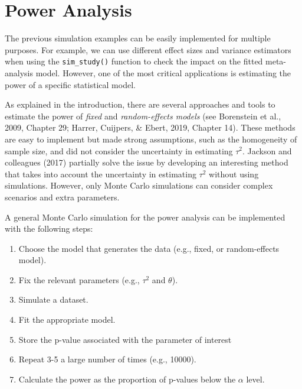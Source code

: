 \documentclass[
  man,floatsintext]{apa6}
\providecommand{\tightlist}{%
  \setlength{\itemsep}{0pt}\setlength{\parskip}{0pt}}
\begin{document}
\normalsize

\hypertarget{power-analysis}{%
\section{Power Analysis}\label{power-analysis}}

The previous simulation examples can be easily implemented for multiple purposes. For example, we can use different effect sizes and variance estimators when using the \texttt{sim\_study()} function to check the impact on the fitted meta-analysis model. However, one of the most critical applications is estimating the power of a specific statistical model.

As explained in the introduction, there are several approaches and tools to estimate the power of \emph{fixed} and \emph{random-effects models} (see Borenstein et al., 2009, Chapter 29; Harrer, Cuijpers, \& Ebert, 2019, Chapter 14). These methods are easy to implement but made strong assumptions, such as the homogeneity of sample size, and did not consider the uncertainty in estimating \(\tau^{2}\). Jackson and colleagues (2017)
partially solve the issue by developing an interesting method that takes into account the uncertainty in estimating \(\tau^{2}\) without using simulations. However, only Monte Carlo simulations can consider complex scenarios and extra parameters.

A general Monte Carlo simulation for the power analysis can be implemented with the following steps:

\begin{enumerate}
\def\labelenumi{\arabic{enumi}.}
\tightlist
\item
  Choose the model that generates the data (e.g., fixed, or random-effects model).
\item
  Fix the relevant parameters (e.g., \(\tau^{2}\) and \(\theta\)).
\item
  Simulate a dataset.
\item
  Fit the appropriate model.
\item
  Store the p-value associated with the parameter of interest
\item
  Repeat 3-5 a large number of times (e.g., 10000).
\item
  Calculate the power as the proportion of p-values below the \(\alpha\) level.
\end{enumerate}
\end{document}
